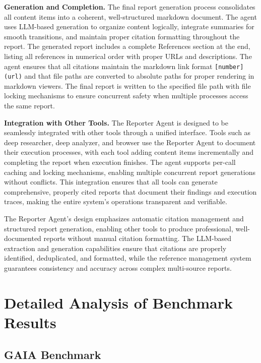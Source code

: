 \documentclass[11pt]{article}
\begin{document}
\textbf{Generation and Completion.} The final report generation process consolidates all content items into a coherent, well-structured markdown document. The agent uses LLM-based generation to organize content logically, integrate summaries for smooth transitions, and maintain proper citation formatting throughout the report. The generated report includes a complete References section at the end, listing all references in numerical order with proper URLs and descriptions. The agent ensures that all citations maintain the markdown link format \texttt{[number](url)} and that file paths are converted to absolute paths for proper rendering in markdown viewers. The final report is written to the specified file path with file locking mechanisms to ensure concurrent safety when multiple processes access the same report.

\textbf{Integration with Other Tools.} The Reporter Agent is designed to be seamlessly integrated with other tools through a unified interface. Tools such as deep researcher, deep analyzer, and browser use the Reporter Agent to document their execution processes, with each tool adding content items incrementally and completing the report when execution finishes. The agent supports per-call caching and locking mechanisms, enabling multiple concurrent report generations without conflicts. This integration ensures that all tools can generate comprehensive, properly cited reports that document their findings and execution traces, making the entire system's operations transparent and verifiable.

The Reporter Agent's design emphasizes automatic citation management and structured report generation, enabling other tools to produce professional, well-documented reports without manual citation formatting. The LLM-based extraction and generation capabilities ensure that citations are properly identified, deduplicated, and formatted, while the reference management system guarantees consistency and accuracy across complex multi-source reports.

\section{Detailed Analysis of Benchmark Results}

\subsection{GAIA Benchmark}
\end{document}
